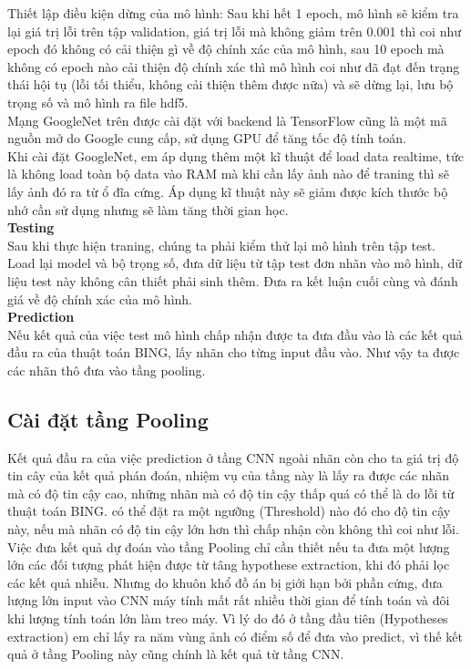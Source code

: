 \documentclass[13pt, a4paper]{extreport}
\begin{document}
\indent Thiết lập điều kiện dừng của mô hình: Sau khi hết 1 epoch, mô hình sẽ kiểm tra lại giá trị lỗi trên tập validation, giá trị lỗi mà không giảm trên 0.001 thì coi như epoch đó không có cải thiện gì về độ chính xác của mô hình, sau 10 epoch mà không có epoch nào cải thiện độ chính xác thì mô hình coi như đã đạt đến trạng thái hội tụ (lỗi tối thiểu, không cải thiện thêm được nữa) và sẽ dừng lại, lưu bộ trọng số và mô hình ra file hdf5.\\
\indent Mạng GoogleNet trên được cài đặt với backend là TensorFlow cũng là một mã nguồn mở do Google cung cấp, sử dụng GPU để tăng tốc độ tính toán.\\
\indent Khi cài đặt GoogleNet, em áp dụng thêm một kĩ thuật để load data realtime, tức là không load toàn bộ data vào RAM mà khi cần lấy ảnh nào để traning thì sẽ lấy ảnh đó ra từ ổ đĩa cứng. Áp dụng kĩ thuật này sẽ giảm được kích thước bộ nhớ cần sử dụng nhưng sẽ làm tăng thời gian học.\\
\indent \textbf{Testing}\\
\indent Sau khi thực hiện traning, chúng ta phải kiểm thử lại mô hình trên tập test. Load lại model và bộ trọng số, đưa dữ liệu từ tập test đơn nhãn vào mô hình, dữ liệu test này không cân thiết phải sinh thêm. Đưa ra kết luận cuối cùng và đánh giá về độ chính xác của mô hình.\\
\indent \textbf{Prediction}\\
\indent Nếu kết quả của việc test mô hình chấp nhận được ta đưa đầu vào là các kết quả đầu ra của thuật toán BING, lấy nhãn cho từng input đầu vào. Như vậy ta được các nhãn thô đưa vào tầng pooling.
\subsection{Cài đặt tầng Pooling}
\indent Kết quả đầu ra của việc prediction ở tầng CNN ngoài nhãn còn cho ta giá trị độ tin cây của kết quả phán đoán, nhiệm vụ của tầng này là lấy ra được các nhãn mà có độ tin cậy cao, những nhãn mà có độ tin cậy thấp quá có thể là do lỗi từ thuật toán BING. có thể đặt ra một ngưỡng (Threshold) nào đó cho độ tin cậy này, nếu mà nhãn có độ tin cậy lớn hơn thì chấp nhận còn không thì coi như lỗi.\\
\indent Việc đưa kết quả dự đoán vào tầng Pooling chỉ cần thiết nếu ta đưa một lượng lớn các đối tượng phát hiện được từ tâng hypothese extraction, khi đó phải lọc các kết quả nhiễu. Nhưng do khuôn khổ đồ án bị giới hạn bởi phần cứng, đưa lượng lớn input vào CNN máy tính mất rất nhiều thời gian để tính toán và đôi khi lượng tính toán lớn làm treo máy. Vì lý do đó ở tầng đầu tiên (Hypotheses extraction) em chỉ lấy ra năm vùng ảnh có điểm số để đưa vào predict, vì thế kết quả ở tầng Pooling này cũng chính là kết quả từ tầng CNN.\\
\end{document}
